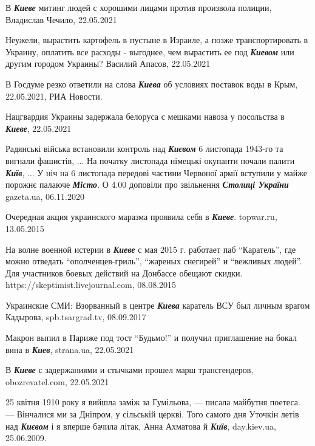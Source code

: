  
 
 
 
 

\def\kv#1{\textbf{\emph{#1}}}

В \kv{Киеве} митинг людей с хорошими лицами против произвола полиции, Владислав
Чечило, 22.05.2021

Неужели, вырастить картофель в пустыне в Израиле, а позже транспортировать в
Украину, оплатить все расходы - выгоднее, чем вырастить ее под \kv{Киевом} или
другим городом Украины? Василий Апасов, 22.05.2021

В Госдуме резко ответили на слова \kv{Киева} об условиях поставок воды в Крым,
22.05.2021, РИА Новости.

Нацгвардия Украины задержала белоруса с мешками навоза у посольства в
\kv{Киеве}, 22.05.2021

Радянські війська встановили контроль над \kv{Києвом} 6 листопада 1943-го та
вигнали фашистів, ... На початку листопада німецькі окупанти почали палити
\kv{Київ}, ... У ніч на 6 листопада передові частини Червоної армії вступили у
майже порожнє палаюче \kv{Місто}. О 4.00 доповіли про звільнення \kv{Столиці
України} gazeta.ua, 06.11.2020

Очередная акция украинского маразма проявила себя в \kv{Киеве}. topwar.ru,
13.05.2015

На волне военной истерии в \kv{Киеве} с мая 2015 г. работает паб
\enquote{Каратель}, где можно отведать \enquote{ополченцев-гриль},
\enquote{жареных снегирей} и \enquote{вежливых людей}.  Для участников боевых
действий на Донбассе обещают скидки.  https://skeptimist.livejournal.com,
08.08.2015

Украинские СМИ: Взорванный в центре \kv{Киева} каратель ВСУ был личным врагом
Кадырова, spb.tsargrad.tv, 08.09.2017

Макрон выпил в Париже под тост \enquote{Будьмо!} и получил приглашение на бокал
вина в \kv{Киев}, strana.ua, 22.05.2021

В \kv{Киеве} с задержаниями и стычками прошел марш трансгендеров, obozrevatel.com, 22.05.2021

25 квітня 1910 року я вийшла заміж за Гумільова, — писала майбутня поетеса. —
Вінчалися ми за Дніпром, у сільській церкві. Того самого дня Уточкін летів над
\kv{Києвом} і я вперше бачила літак, Анна Ахматова й \kv{Київ},
day.kiev.ua, 25.06.2009.

